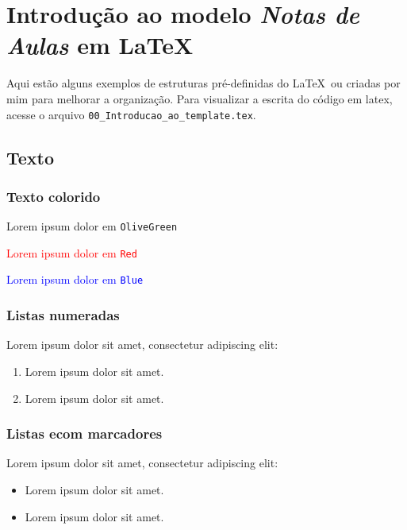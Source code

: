 \chapter{Introdução ao modelo \textit{Notas de Aulas} em \LaTeX}

Aqui estão alguns exemplos de estruturas pré-definidas do \LaTeX\ ou criadas por mim para melhorar a organização. Para visualizar a escrita do código em latex, acesse o arquivo \verb|00_Introducao_ao_template.tex|.


\section{Texto}

\subsection{Texto colorido}

{\textcolor{OliveGreen}{Lorem ipsum dolor em \texttt{OliveGreen}}}

{\textcolor{Red}{Lorem ipsum dolor em \texttt{Red}}}

{\textcolor{Blue}{Lorem ipsum dolor em \texttt{Blue}}}


\subsection{Listas numeradas}

Lorem ipsum dolor sit amet, consectetur adipiscing elit:
\begin{enumerate}
    \item Lorem ipsum dolor sit amet.
    \item Lorem ipsum dolor sit amet.
\end{enumerate}


\subsection{Listas ecom marcadores}

Lorem ipsum dolor sit amet, consectetur adipiscing elit:
\begin{itemize}
    \item Lorem ipsum dolor sit amet.
    \item Lorem ipsum dolor sit amet.
\end{itemize}


